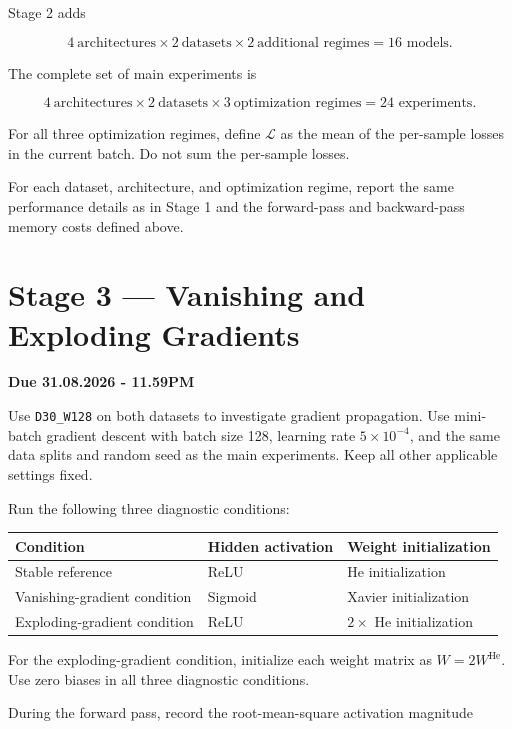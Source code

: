 \documentclass[11pt,a4paper]{article}
\newcommand{\code}[1]{\texttt{#1}}
\begin{document}
Stage 2 adds

\[
4\ \text{architectures}\times2\ \text{datasets}\times2\ \text{additional regimes}
=\boxed{16\text{ models}}.
\]

The complete set of main experiments is

\[
4\ \text{architectures}\times2\ \text{datasets}\times3\ \text{optimization regimes}
=\boxed{24\text{ experiments}}.
\]

For all three optimization regimes, define $\mathcal{L}$ as the mean of the per-sample losses in the current batch. Do not sum the per-sample losses.

For each dataset, architecture, and optimization regime, report the same performance details as in Stage 1 and the forward-pass and backward-pass memory costs defined above.

\section{Stage 3 --- Vanishing and Exploding Gradients}

\textbf{Due 31.08.2026 - 11.59PM}

Use \code{D30\_W128} on both datasets to investigate gradient propagation. Use mini-batch gradient descent with batch size 128, learning rate $5\times10^{-4}$, and the same data splits and random seed as the main experiments. Keep all other applicable settings fixed.

Run the following three diagnostic conditions:

\begin{center}
\begin{tabular}{lll}
\toprule
\textbf{Condition} & \textbf{Hidden activation} & \textbf{Weight initialization} \\
\midrule
Stable reference & ReLU & He initialization \\
Vanishing-gradient condition & Sigmoid & Xavier initialization \\
Exploding-gradient condition & ReLU & $2\times$ He initialization \\
\bottomrule
\end{tabular}
\end{center}

For the exploding-gradient condition, initialize each weight matrix as $W=2W^{\mathrm{He}}$. Use zero biases in all three diagnostic conditions.

During the forward pass, record the root-mean-square activation magnitude
\end{document}
